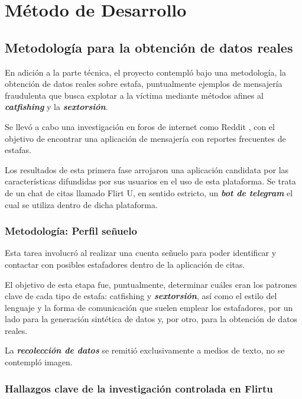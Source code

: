 \chapter{Método de Desarrollo}

\section{Metodología para la obtención de datos reales}

En adición a la parte técnica, el proyecto contempló bajo una metodología, la obtención de datos reales sobre estafa, puntualmente ejemplos de mensajería fraudulenta que busca explotar a la víctima mediante métodos afines al \textbf{\textit{catfishing}} y la \textbf{\textit{sextorsión}}.

Se llevó a cabo una investigación en foros de internet como Reddit \cite{RedditFlirtu2025}, con el objetivo de encontrar una aplicación de mensajería con reportes frecuentes de estafas.

Los resultados de esta primera fase arrojaron una aplicación candidata por las características difundidas por sus usuarios en el uso de esta plataforma. Se trata de un chat de citas llamado Flirt U, en sentido estricto, un \textbf{\textit{bot de telegram}} el cual se utiliza dentro de dicha plataforma.
\cite{RedditFlirtu2025}
\cite{telegramRisks}

\subsection{Metodología: Perfil señuelo}

Esta tarea involucró al realizar una cuenta señuelo para poder identificar y contactar con posibles estafadores dentro de la aplicación de citas.

El objetivo de esta etapa fue, puntualmente, determinar cuáles eran los patrones clave de cada tipo de estafa: catfishing y \textbf{\textit{sextorsión}}, así como el estilo del lenguaje y la forma de comunicación que suelen emplear los estafadores, por un lado para la generación sintética de datos y, por otro, para la obtención de datos reales.

La \textbf{\textit{recolección de datos}} se remitió exclusivamente a medios de texto, no se contempló imagen.

\subsection{Hallazgos clave de la investigación controlada en Flirtu}

